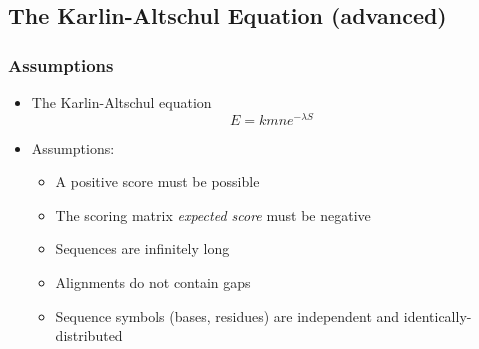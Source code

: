 
\subsection{The Karlin-Altschul Equation (advanced)}
\begin{frame}
  \frametitle{Assumptions}
  \begin{itemize}
    \item The Karlin-Altschul equation
    \begin{equation*}
      E = k m n e^{-\lambda S}
    \end{equation*}
    \item Assumptions:
    \begin{itemize}
      \item A positive score must be possible
      \item The scoring matrix \emph{expected score} must be negative
      \item Sequences are infinitely long
      \item Alignments do not contain gaps
      \item Sequence symbols (bases, residues) are independent and identically-distributed
    \end{itemize}
  \end{itemize}
\end{frame} 